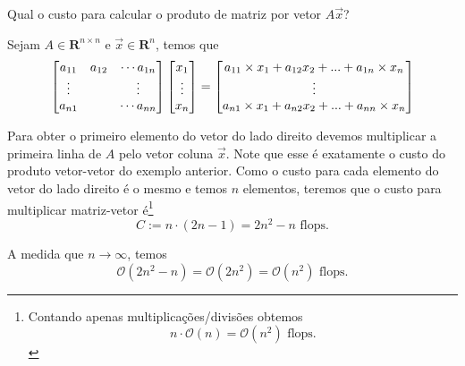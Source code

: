 \begin{ex}
Qual o custo para calcular o produto de matriz por vetor $A \vec{x}$?
\end{ex}
\begin{sol}
 Sejam $A \in \mathbf{R}^{n\times n}$ e $\vec{x} \in \mathbf{R}^n$, temos que
\begin{equation}
  \begin{bmatrix} a_{11}&a_{12}&\cdots a_{1n} \\ \vdots&&\vdots \\ a_{n1}&&\cdots a_{nn} \end{bmatrix} \begin{bmatrix} x_1 \\ \vdots \\ x_n \end{bmatrix}
  =\begin{bmatrix}  a_{11}\times x_1 + a_{12}x_2 +...+a_{1n}\times x_n  \\ \vdots \\ a_{n1}\times x_1 + a_{n2}x_2 +...+a_{nn}\times x_n \end{bmatrix} 
\end{equation}

Para obter o primeiro elemento do vetor do lado direito devemos multiplicar a  primeira linha de $A$ pelo vetor coluna $\vec{x}$. Note que esse é exatamente o custo do produto vetor-vetor do exemplo anterior. Como o custo para cada elemento do vetor do lado direito é o mesmo e temos $n$ elementos, teremos que o custo para multiplicar matriz-vetor é\footnote{Contando apenas multiplicações/divisões obtemos
\begin{equation}
  n\cdot \mathcal{O}(n) = \mathcal{O}(n^2) \text{~flops.}
\end{equation}
} 
\begin{equation}
  C:=n \cdot ( 2n-1) = 2n^2-n \text{~flops}.
\end{equation}

A medida que $n \rightarrow \infty$, temos  
\begin{equation}
  \mathcal{O}(2n^2-n) =\mathcal{O}(2n^2)=\mathcal{O}(n^2) \text{~flops.}
\end{equation}

\end{sol}

